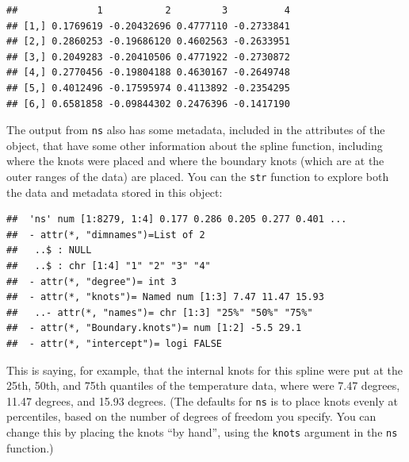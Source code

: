 \documentclass[
]{book}
\newenvironment{Shaded}{\begin{snugshade}}{\end{snugshade}}
\newcommand{\AttributeTok}[1]{\textcolor[rgb]{0.77,0.63,0.00}{#1}}
\newcommand{\DecValTok}[1]{\textcolor[rgb]{0.00,0.00,0.81}{#1}}
\newcommand{\FunctionTok}[1]{\textcolor[rgb]{0.00,0.00,0.00}{#1}}
\newcommand{\NormalTok}[1]{#1}
\newcommand{\SpecialCharTok}[1]{\textcolor[rgb]{0.00,0.00,0.00}{#1}}
\begin{document}
\begin{Shaded}
\end{Shaded}

\begin{verbatim}
##              1           2         3          4
## [1,] 0.1769619 -0.20432696 0.4777110 -0.2733841
## [2,] 0.2860253 -0.19686120 0.4602563 -0.2633951
## [3,] 0.2049283 -0.20410506 0.4771922 -0.2730872
## [4,] 0.2770456 -0.19804188 0.4630167 -0.2649748
## [5,] 0.4012496 -0.17595974 0.4113892 -0.2354295
## [6,] 0.6581858 -0.09844302 0.2476396 -0.1417190
\end{verbatim}

The output from \texttt{ns} also has some metadata, included in the attributes of the object, that
have some other information about the spline function, including where the knots were
placed and where the boundary knots (which are at the outer ranges of the data) are placed.
You can the \texttt{str} function to explore both the data and metadata stored in this object:

\begin{Shaded}
\end{Shaded}

\begin{verbatim}
##  'ns' num [1:8279, 1:4] 0.177 0.286 0.205 0.277 0.401 ...
##  - attr(*, "dimnames")=List of 2
##   ..$ : NULL
##   ..$ : chr [1:4] "1" "2" "3" "4"
##  - attr(*, "degree")= int 3
##  - attr(*, "knots")= Named num [1:3] 7.47 11.47 15.93
##   ..- attr(*, "names")= chr [1:3] "25%" "50%" "75%"
##  - attr(*, "Boundary.knots")= num [1:2] -5.5 29.1
##  - attr(*, "intercept")= logi FALSE
\end{verbatim}

This is saying, for example, that the internal knots for this spline were put at the
25th, 50th, and 75th quantiles of the temperature data, where were 7.47 degrees, 11.47 degrees,
and 15.93 degrees. (The defaults for \texttt{ns} is to place knots evenly at percentiles, based
on the number of degrees of freedom you specify. You can change this by placing the knots
``by hand'', using the \texttt{knots} argument in the \texttt{ns} function.)
\end{document}
